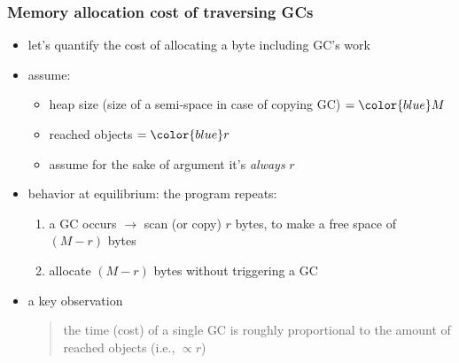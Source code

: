\documentclass[11pt,dvipdfmx]{beamer}
\newcommand{\ao}[1]{{\color{blue}#1}}
\begin{document}
\begin{frame}
\frametitle{Memory allocation cost of traversing GCs}
\begin{itemize}
\item let's quantify the cost of
  allocating a byte including GC's work
  
\item assume:
  \begin{itemize}
  \item heap size (size of a semi-space in case of copying GC) $= \ao{M}$
  \item reached objects $= \ao{r}$
  \item {\footnotesize assume for the sake of argument it's {\it always} $r$}
  \end{itemize}

\item<3-> behavior at equilibrium: the program repeats:
  \begin{enumerate}
  \item a GC occurs $\rightarrow$ scan (or copy) $r$ bytes,
    to make a free space of $(M - r)$ bytes
  \item allocate $(M - r)$ bytes without triggering a GC
  \end{enumerate}

\item<4-> a key observation
\begin{quote}
  \ao{the time (cost) of a single GC
  is roughly proportional to the amount of reached objects (i.e., $\propto r$)}
\end{quote}
  
\end{itemize}

\begin{center}
%
%
%
\end{center}

\end{frame}
\end{document}
